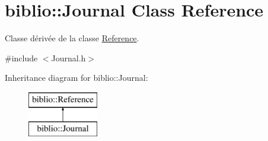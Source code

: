 \hypertarget{classbiblio_1_1Journal}{}\section{biblio\+:\+:Journal Class Reference}
\label{classbiblio_1_1Journal}


Classe dérivée de la classe \hyperlink{classbiblio_1_1Reference}{Reference}.  




{\ttfamily \#include $<$Journal.\+h$>$}

Inheritance diagram for biblio\+:\+:Journal\+:\begin{figure}[H]
\begin{center}
\leavevmode
\includegraphics[height=2.000000cm]{classbiblio_1_1Journal}
\end{center}
\end{figure}
